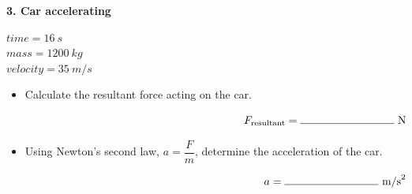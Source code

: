 \documentclass[12pt]{article}
\begin{document}
\noindent
\begin{minipage}[t]{0.48\textwidth}

\textbf{3. Car accelerating}

\vspace{0.5cm}
$time = \SI{16}{s}$ \\
$mass = \SI{1200}{kg}$ \\
$velocity = \SI{35}{m/s}$ \\

\vspace{0.5cm}

\begin{center}
\end{center}

\end{minipage}
\hfill
\begin{minipage}[t]{0.48\textwidth}

\begin{itemize}[label={}, leftmargin=*]
    \item Calculate the resultant force acting on the car.

    \vspace{2.0cm}
    \[
    \makebox[\linewidth][r]{$F_{\text{resultant}} = \rule{3cm}{0.4pt}\ \text{N}$}
    \]

    \item Using Newton’s second law, $a = \dfrac{F}{m}$, determine the acceleration of the car.

    \vspace{2.0cm}
    \[
    \makebox[\linewidth][r]{$a = \rule{3cm}{0.4pt}\ \text{m/s}^{2}$}
    \]
\end{itemize}

\end{minipage}

\vspace{1.2cm}
\end{document}
